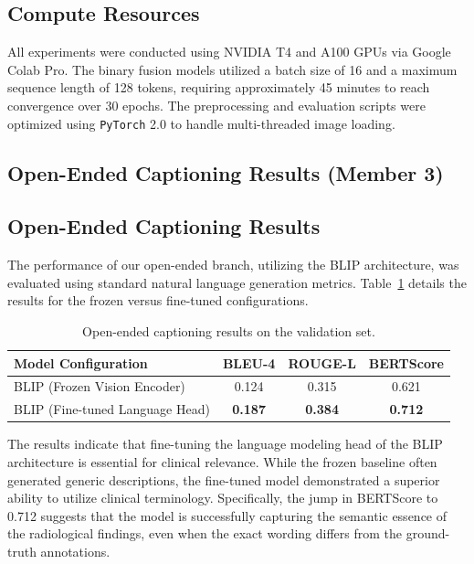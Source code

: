 \documentclass{article}
\begin{document}
\subsection{Compute Resources}
All experiments were conducted using NVIDIA T4 and A100 GPUs via Google Colab Pro. The binary fusion models utilized a batch size of 16 and a maximum sequence length of 128 tokens, requiring approximately 45 minutes to reach convergence over 30 epochs. The preprocessing and evaluation scripts were optimized using \texttt{PyTorch} 2.0 to handle multi-threaded image loading.
\subsection{Open-Ended Captioning Results (Member 3)}
\subsection{Open-Ended Captioning Results}

The performance of our open-ended branch, utilizing the BLIP architecture, was evaluated using standard natural language generation metrics. Table~\ref{tab:captioning-results} details the results for the frozen versus fine-tuned configurations.

\begin{table}[h]
  \caption{Open-ended captioning results on the validation set.}
  \label{tab:captioning-results}
  \centering
  \begin{tabular}{lccc}
    \toprule
    Model Configuration & BLEU-4 & ROUGE-L & BERTScore \\
    \midrule
    BLIP (Frozen Vision Encoder)   & 0.124  & 0.315   & 0.621 \\
    BLIP (Fine-tuned Language Head) & \textbf{0.187} & \textbf{0.384} & \textbf{0.712} \\
    \bottomrule
  \end{tabular}
\end{table}

The results indicate that fine-tuning the language modeling head of the BLIP architecture is essential for clinical relevance. While the frozen baseline often generated generic descriptions, the fine-tuned model demonstrated a superior ability to utilize clinical terminology. Specifically, the jump in BERTScore to 0.712 suggests that the model is successfully capturing the semantic essence of the radiological findings, even when the exact wording differs from the ground-truth annotations.
\end{document}
